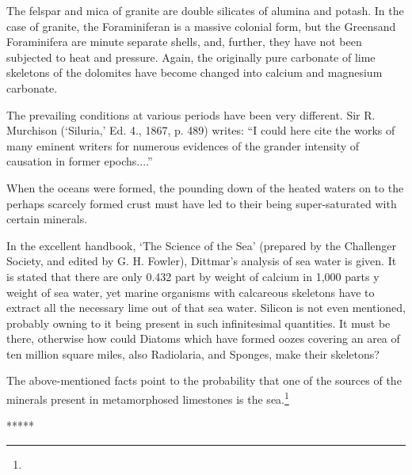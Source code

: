\documentclass[a4paper, 12pt, oneside]{article}
\begin{document}
The felspar and mica of granite are double silicates of alumina and potash. In the case of granite, the Foraminiferan is a massive colonial form, but the Greensand Foraminifera are minute separate shells, and, further, they have not been subjected to heat and pressure. Again, the originally pure carbonate of lime skeletons of the dolomites have become changed into calcium and magnesium carbonate.

The prevailing conditions at various periods have been very different. Sir R. Murchison (`Siluria,' Ed. 4., 1867, p. 489) writes: ``I could here cite the works of many eminent writers for numerous evidences of the grander intensity of causation in former epochs....''

When the oceans were formed, the pounding down of the heated waters on to the perhaps scarcely formed crust must have led to their being super-saturated with certain minerals.

In the excellent handbook, `The Science of the Sea' (prepared by the Challenger Society, and edited by G. H. Fowler), Dittmar's analysis of sea water is given. It is stated that there are only 0.432 part by weight of calcium in 1,000 parts y weight of sea water, yet marine organisms with calcareous skeletons have to extract all the necessary lime out of that sea water. Silicon is not even mentioned, probably owning to it being present in such infinitesimal quantities. It must be there, otherwise how could Diatoms which have formed oozes covering an area of ten million square miles, also Radiolaria, and Sponges, make their skeletons?

The above-mentioned facts point to the probability that one of the sources of the minerals present in metamorphosed limestones is the sea.\footnote{}

\centerline{*\hspace{15mm}*\hspace{15mm}*\hspace{15mm}*\hspace{15mm}*}
\bigskip
\end{document}
